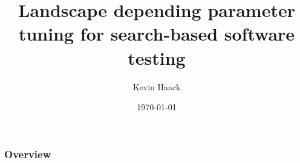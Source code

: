\documentclass[aspectratio=169]{beamer}
\title{Landscape depending parameter
tuning for search-based software testing}
\subtitle{}
\author{Kevin Haack}
\institute{Software Engineering}
\date{\today}
\begin{document}
	
{
	\hnititlebackground 
	\begin{frame}
		\titlepage
	\end{frame}
}

{
	\begin{frame}
		\frametitle{Overview}
		\tableofcontents
	\end{frame}
}






{
	\hnifullbackground 
	
	\begin{frame}
		\textbf{\Huge{\centerline{}}}
	\end{frame}
}
\end{document}
